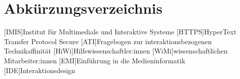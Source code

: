 
\cleardoublepage
{}
\chapter*{Abkürzungsverzeichnis}
\label{section-abbrevs}

\begin{acronym}[Companion]
  [IMIS]{Institut für Multimediale und Interaktive Systeme}
  [HTTPS]{HyperText Transfer Protocol Secure}
  [ATI]{Fragebogen zur interaktionsbezogenen Technikaffinität}
  [HiWi]{Hilfswissenschaftler:innen}
  [WiMi]{wissenschaftlichen Mitarbeiter:innen}
  [EMI]{Einführung in die Medieninformatik}
  [IDE]{Interaktionsdesign}
\end{acronym}
